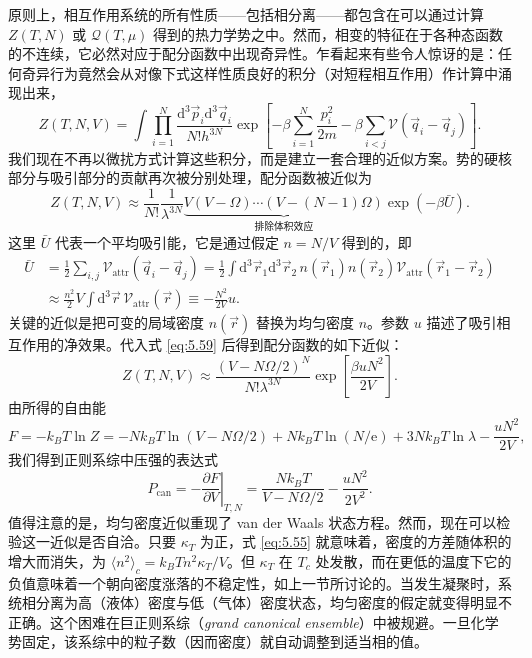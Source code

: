 原则上，相互作用系统的所有性质——包括相分离——都包含在可以通过计算 $Z(T,N)$ 或 $\mathcal{Q}(T,\mu)$ 得到的热力学势之中。然而，相变的特征在于各种态函数的不连续，它必然对应于配分函数中出现奇异性。乍看起来有些令人惊讶的是：任何奇异行为竟然会从对像下式这样性质良好的积分（对短程相互作用）作计算中涌现出来，
\begin{equation}\label{eq:5.58}
Z(T,N,V)=\int\prod_{i=1}^N\frac{\mathrm{d}^3\vec p_i\mathrm{d}^3\vec q_i}{N!h^{3N}}\exp\left[-\beta\sum_{i=1}^N\frac{p_i^2}{2m}-\beta\sum_{i<j}\mathscr V(\vec q_i-\vec q_j)\right].
\end{equation}
我们现在不再以微扰方式计算这些积分，而是建立一套合理的近似方案。势的硬核部分与吸引部分的贡献再次被分别处理，配分函数被近似为
\begin{equation}\label{eq:5.59}
Z(T,N,V)\approx\frac{1}{N!}\frac{1}{\lambda^{3N}}\underbrace{V(V-\Omega)\cdots(V-(N-1)\Omega)}_{\text{排除体积效应}}\exp(-\beta\bar U).
\end{equation}
这里 $\bar U$ 代表一个平均吸引能，它是通过假定 $n=N/V$ 得到的，即
\begin{equation}\label{eq:5.60}
\begin{aligned}
\bar U&=\frac{1}{2}\sum_{i,j}\mathscr V_{\text{attr}}(\vec q_i-\vec q_j)=\frac{1}{2}\int\mathrm{d}^3\vec r_1\mathrm{d}^3\vec r_2\,n(\vec r_1)n(\vec r_2)\mathscr V_{\text{attr}}(\vec r_1-\vec r_2)\\
&\approx\frac{n^2}{2}V\int\mathrm{d}^3\vec r\,\mathscr V_{\text{attr}}(\vec r)\equiv-\frac{N^2}{2V}u.
\end{aligned}
\end{equation}
关键的近似是把可变的局域密度 $n(\vec r)$ 替换为均匀密度 $n$。参数 $u$ 描述了吸引相互作用的净效果。代入式 \eqref{eq:5.59} 后得到配分函数的如下近似：
\begin{equation}\label{eq:5.61}
Z(T,N,V)\approx\frac{(V-N\Omega/2)^N}{N!\lambda^{3N}}\exp\left[\frac{\beta uN^2}{2V}\right].
\end{equation}
由所得的自由能
\begin{equation}\label{eq:5.62}
F=-k_BT\ln Z=-Nk_BT\ln(V-N\Omega/2)+Nk_BT\ln(N/\mathrm{e})+3Nk_BT\ln\lambda-\frac{uN^2}{2V},
\end{equation}
我们得到正则系综中压强的表达式
\begin{equation}\label{eq:5.63}
P_{\text{can}}=-\left.\frac{\partial F}{\partial V}\right|_{T,N}=\frac{Nk_BT}{V-N\Omega/2}-\frac{uN^2}{2V^2}.
\end{equation}
值得注意的是，均匀密度近似重现了 van der Waals 状态方程。然而，现在可以检验这一近似是否自洽。只要 $\kappa_T$ 为正，式 \eqref{eq:5.55} 就意味着，密度的方差随体积的增大而消失，为 $\langle n^2\rangle_c=k_BTn^2\kappa_T/V$。但 $\kappa_T$ 在 $T_c$ 处发散，而在更低的温度下它的负值意味着一个朝向密度涨落的不稳定性，如上一节所讨论的。当发生凝聚时，系统相分离为高（液体）密度与低（气体）密度状态，均匀密度的假定就变得明显不正确。这个困难在巨正则系综（\textit{grand canonical ensemble}）中被规避。一旦化学势固定，该系综中的粒子数（因而密度）就自动调整到适当相的值。

